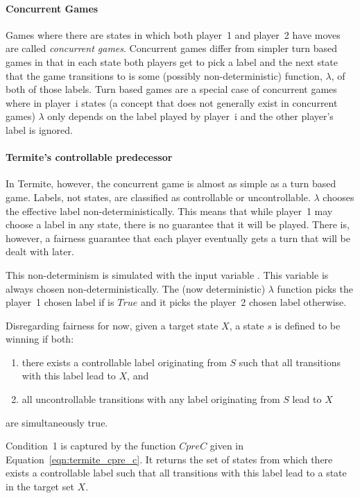 \paragraph{Concurrent Games}

Games where there are states in which both player~1 and player~2 have moves are called \emph{concurrent games}. Concurrent games differ from simpler turn based games in that in each state both players get to pick a label and the next state that the game transitions to is some (possibly non-deterministic) function, $\lambda$, of both of those labels. Turn based games are a special case of concurrent games where in player~i states (a concept that does not generally exist in concurrent games) $\lambda$ only depends on the label played by player~i and the other player's label is ignored. 

\paragraph{Termite's controllable predecessor}

In Termite, however, the concurrent game is almost as simple as a turn based game. Labels, not states, are classified as controllable or uncontrollable. $\lambda$ chooses the effective label non-deterministically. This means that while player~1 may choose a label in any state, there is no guarantee that it will be played. There is, however, a fairness guarantee that each player eventually gets a turn that will be dealt with later.

This non-determinism is simulated with the input variable . This variable is always chosen non-deterministically. The (now deterministic) $\lambda$ function picks the player~1 chosen label if  is $True$ and it picks the player~2 chosen label otherwise.

Disregarding fairness for now, given a target state $X$, a state $s$ is defined to be winning if both:
\begin{enumerate}
    \item there exists a controllable label originating from $S$ such that all transitions with this label lead to $X$, and
    \item all uncontrollable transitions with any label originating from $S$ lead to $X$
\end{enumerate}
\noindent are simultaneously true. 

Condition~1 is captured by the function $CpreC$ given in Equation~\ref{eqn:termite_cpre_c}. It returns the set of states from which there exists a controllable label such that all transitions with this label lead to a state in the target set $X$.

